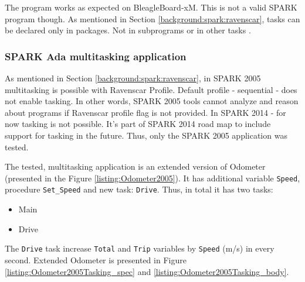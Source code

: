 The program works as expected on BleagleBoard-xM. This is not a valid SPARK program though. As mentioned in Section \ref{background:spark:ravenscar}, tasks can be declared only in packages. Not in subprograms or in other tasks \cite{Barnes:Book}.

\subsubsection{SPARK Ada multitasking application}

As mentioned in Section \ref{background:spark:ravenscar}, in SPARK 2005 multitasking is possible with Ravenscar Profile. Default profile - sequential -  does not enable tasking. In other words, SPARK 2005 tools cannot analyze and reason about programs if Ravenscar profile flag is not provided. In SPARK 2014 - for now tasking is not possible. It's part of SPARK 2014 road map to include support for tasking in the future. Thus, only the SPARK 2005 application was tested.

The tested, multitasking application is an extended version of Odometer (presented in the Figure \ref{listing:Odometer2005}). It has additional variable \lstinline{Speed}, procedure \lstinline{Set_Speed} and new task: \lstinline{Drive}. Thus, in total it has two tasks:
\begin{itemize}
    \item Main
    \item Drive
\end{itemize}

The \lstinline{Drive} task increase \lstinline{Total} and \lstinline{Trip} variables by \lstinline{Speed} (m/s) in every second. Extended Odometer is presented in Figure \ref{listing:Odometer2005Tasking_spec} and \ref{listing:Odometer2005Tasking_body}. 

